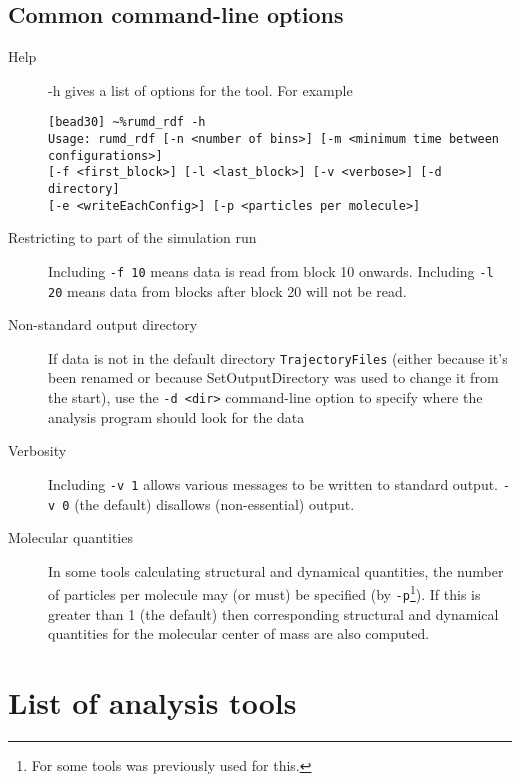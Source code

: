 \documentclass[a4paper]{article}
\begin{document}


\subsection{Common command-line options}

\begin{description}
\item[Help]  -h gives a list of options for the tool. For example
\begin{verbatim}
[bead30] ~%rumd_rdf -h
Usage: rumd_rdf [-n <number of bins>] [-m <minimum time between configurations>]
[-f <first_block>] [-l <last_block>] [-v <verbose>] [-d directory] 
[-e <writeEachConfig>] [-p <particles per molecule>]
\end{verbatim}
\item[Restricting to part of the simulation run] Including \verb|-f 10| means
data is read from block 10 onwards. Including \verb|-l 20| means data from 
blocks after block 20 will not be read.
\item[Non-standard output directory] If data is not in the default directory 
\verb|TrajectoryFiles| (either because 
it's been renamed or because SetOutputDirectory was used to change it from the
start), use the \verb|-d <dir>| 
command-line option to specify where the analysis 
program should look for the data
\item[Verbosity] Including \verb|-v 1| allows various messages to be written
to standard output. \verb|-v 0| (the default) disallows (non-essential) output.
\item[Molecular quantities] In some tools calculating structural and dynamical
quantities, the number of particles per molecule
may (or must) be specified (by \verb|-p|\footnote{For some tools  was previously used for this.}). If this is greater than 1 (the default) then corresponding structural 
and dynamical quantities for the molecular center of mass are also computed.
\end{description}

\section{List of analysis tools}
\end{document}
